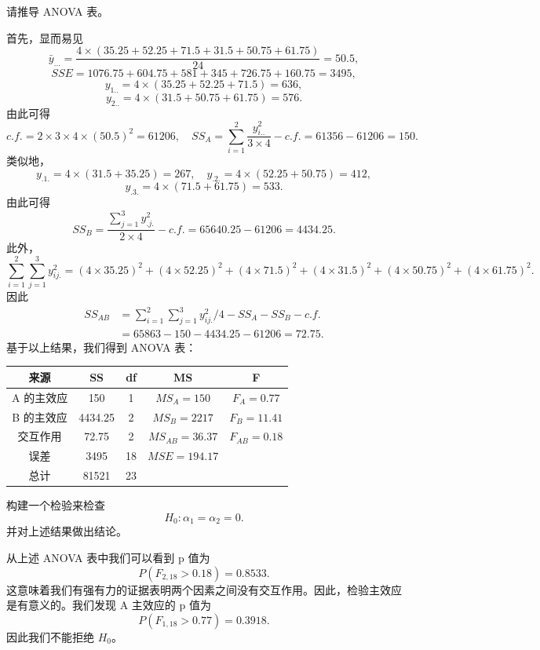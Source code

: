 \begin{questions}
请推导 ANOVA 表。

\begin{solution}
首先，显而易见
\[
\bar{y}_{...} = \frac{4 \times (35.25 + 52.25 + 71.5 + 31.5 + 50.75 + 61.75)}{24} = 50.5,
\]
\[
SSE = 1076.75 + 604.75 + 581 + 345 + 726.75 + 160.75 = 3495,
\]
\[
y_{1..} = 4 \times (35.25 + 52.25 + 71.5) = 636,
\]
\[
y_{2..} = 4 \times (31.5 + 50.75 + 61.75) = 576.
\]
由此可得
\[
c.f. = 2 \times 3 \times 4 \times (50.5)^2 = 61206, \quad SS_A = \sum_{i=1}^{2} \frac{y_{i..}^2}{3 \times 4} - c.f. = 61356 - 61206 = 150.
\]
类似地，
\[
y_{.1.} = 4 \times (31.5 + 35.25) = 267, \quad y_{.2.} = 4 \times (52.25 + 50.75) = 412,
\]
\[
y_{.3.} = 4 \times (71.5 + 61.75) = 533.
\]
由此可得
\[
SS_B = \frac{\sum_{j=1}^{3} y_{.j.}^2}{2 \times 4} - c.f. = 65640.25 - 61206 = 4434.25.
\]
此外，
\[
\sum_{i=1}^{2} \sum_{j=1}^{3} y_{ij.}^2 = (4 \times 35.25)^2 + (4 \times 52.25)^2 + (4 \times 71.5)^2 + (4 \times 31.5)^2 + (4 \times 50.75)^2 + (4 \times 61.75)^2.
\]
因此
\begin{align*}
SS_{AB} &= \sum_{i=1}^{2} \sum_{j=1}^{3} y_{ij.}^2/4 - SS_A - SS_B - c.f. \\
&= 65863 - 150 - 4434.25 - 61206 = 72.75.
\end{align*}
基于以上结果，我们得到 ANOVA 表：
\begin{center}
\begin{tabular}{c|cccc}
来源 & SS & df & MS & F \\ \hline
A 的主效应 & 150 & 1 & $MS_A = 150$ & $F_A = 0.77$ \\
B 的主效应 & 4434.25 & 2 & $MS_B = 2217$ & $F_B = 11.41$ \\
交互作用 & 72.75 & 2 & $MS_{AB} = 36.37$ & $F_{AB} = 0.18$ \\
误差 & 3495 & 18 & $MSE = 194.17$ & \\ \hline
总计 & 81521 & 23 & & 
\end{tabular}
\end{center}
\end{solution}

\question
构建一个检验来检查
\[
H_0 : \alpha_1 = \alpha_2 = 0.
\]
并对上述结果做出结论。

\begin{solution}
从上述 ANOVA 表中我们可以看到 p 值为
\[
P(F_{2,18} > 0.18) = 0.8533.
\]
这意味着我们有强有力的证据表明两个因素之间没有交互作用。因此，检验主效应是有意义的。我们发现 A 主效应的 p 值为
\[
P(F_{1,18} > 0.77) = 0.3918.
\]
因此我们不能拒绝 $H_0$。
\end{solution}


\end{questions}
